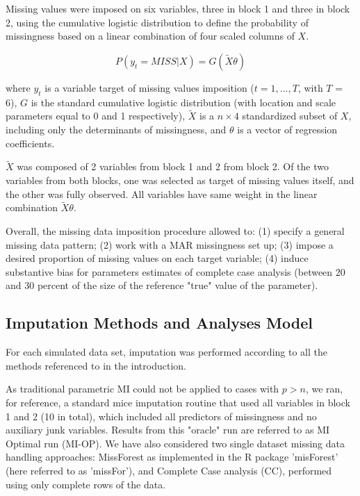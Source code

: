 Missing values were imposed on six variables, three in block 1 and three in block 2, using the cumulative logistic distribution
to define the probability of missingness based on a linear combination of four scaled columns of $X$.

\begin{equation}
	P(y_t = MISS | X) = G(\tilde{X} \theta) \label{eq:PBT_imp}
\end{equation}

where $y_t$ is a variable target of missing values imposition ($t = 1,...,T$, with $T$ = 6), $G$ is the standard cumulative logistic distribution 
(with location and scale parameters equal to 0 and 1 respectively), $\tilde{X}$ is a $n \times 4$ standardized subset of $X$, 
including only the determinants of missingness, and $\theta$ is a vector of regression coefficients. 

$\tilde{X}$ was composed of 2 variables from block 1 and 2 from block 2. Of the two variables from both blocks,
one was selected as target of missing values itself, and the other was fully observed. All variables have same weight
in the linear combination $\tilde{X}\theta$.

\iffalse %
The value of the linear predictor was also "off-setted" to induce missingness in the lower tail of the distribution
of linear predictor $\tilde{X}\theta$. This procedure does not imply that missingness in the target variable depends 
on the target variable itself, as the offset is applied based on the values of $\tilde{X}$.
\fi

Overall, the missing data imposition procedure allowed to: 
(1) specify a general missing data pattern; 
(2) work with a MAR missingness set up;
(3) impose a desired proportion of missing values on each target variable; 
(4) induce substantive bias for parameters estimates of complete case analysis (between 20 and 30 percent of 
the size of the reference "true" value of the parameter).

\subsection{Imputation Methods and Analyses Model}

For each simulated data set, imputation was performed according to all the methods referenced to in the introduction.

As traditional parametric MI could not be applied to cases with $p > n$, we ran, for reference, a standard mice imputation 
routine that used all variables in block 1 and 2 (10 in total), which included all predictors of missingness and no 
auxiliary junk variables. Results from this "oracle" run are referred to as MI Optimal run (MI-OP). 
We have also considered two single dataset missing data handling approaches: MissForest \citep{stekhovenBuhlmann:2011} as 
implemented in the R package 'misForest' (here referred to as 'missFor'), and Complete Case analysis (CC), performed 
using only complete rows of the data.

